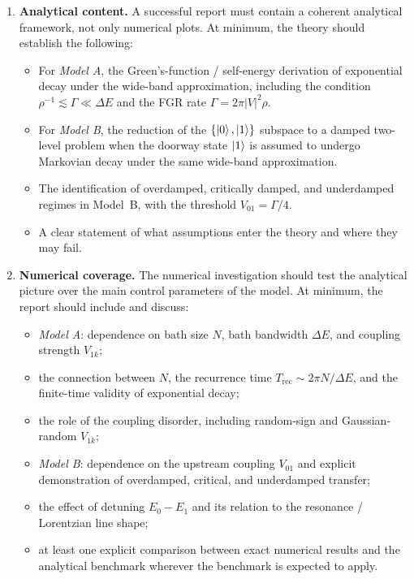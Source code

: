 \documentclass[12pt,letterpaper]{article}
\begin{document}
\begin{enumerate}
\item \textbf{Analytical content.}
  A successful report must contain a coherent analytical framework, not only
  numerical plots.  At minimum, the theory should establish the following:
  \begin{itemize}
    \item For \textit{Model A}, the Green's-function / self-energy derivation
          of exponential decay under the wide-band approximation, including
          the condition
          $\rho^{-1}\lesssim \Gamma \ll \Delta E$ and the FGR rate
          $\Gamma = 2\pi |V|^2 \rho$.
    \item For \textit{Model B}, the reduction of the $\{\ket{0},\ket{1}\}$
          subspace to a damped two-level problem when the doorway state
          $\ket{1}$ is assumed to undergo Markovian decay under the same
          wide-band approximation.
    \item The identification of overdamped, critically damped, and
          underdamped regimes in Model~B, with the threshold
          $V_{01}=\Gamma/4$.
    \item A clear statement of what assumptions enter the theory and where
          they may fail.
  \end{itemize}

\item \textbf{Numerical coverage.}
  The numerical investigation should test the analytical picture over the
  main control parameters of the model.  At minimum, the report should
  include and discuss:
  \begin{itemize}
    \item \textit{Model A}: dependence on bath size $N$, bath bandwidth
          $\Delta E$, and coupling strength $V_{1k}$;
    \item the connection between $N$, the recurrence time
          $T_\mathrm{rec}\sim 2\pi N/\Delta E$, and the finite-time validity
          of exponential decay;
    \item the role of the coupling disorder, including random-sign and
          Gaussian-random $V_{1k}$;
    \item \textit{Model B}: dependence on the upstream coupling $V_{01}$ and
          explicit demonstration of overdamped, critical, and underdamped
          transfer;
    \item the effect of detuning $E_0-E_1$ and its relation to the resonance
          / Lorentzian line shape;
    \item at least one explicit comparison between exact numerical results
          and the analytical benchmark wherever the benchmark is expected to
          apply.
  \end{itemize}


\end{enumerate}
\end{document}
